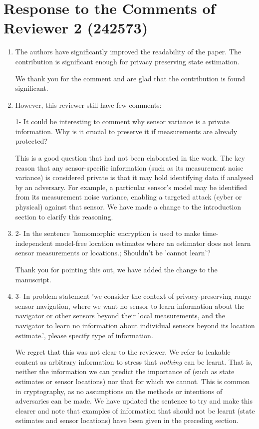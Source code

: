 \documentclass[a4paper]{scrartcl}
\newenvironment{rebuttal}{\begin{enumerate}[label={\color{grey}\thesection.\arabic{enumi}},leftmargin=0pt,ref=\thesection.\arabic{enumi}]}{\end{enumerate}}
\newcommand{\reviewtext}[1]{{\color{nblue} #1}}
\begin{document}
\section*{Response to the Comments of Reviewer 2 (242573)}
\def\thesection{R2}
\begin{rebuttal}
\item \reviewtext{The authors have significantly improved the readability of the paper. The contribution is significant enough for privacy preserving state estimation.}

We thank you for the comment and are glad that the contribution is found significant.

\item \reviewtext{However, this reviewer still have few comments:

1- It could be interesting to comment why sensor variance is a private information. Why is it crucial to preserve it if measurements are already protected?}

This is a good question that had not been elaborated in the work. The key reason that any sensor-specific information (such as its measurement noise variance) is considered private is that it may hold identifying data if analysed by an adversary. For example, a particular sensor's model may be identified from its measurement noise variance, enabling a targeted attack (cyber or physical) against that sensor. We have made a change to the introduction section to clarify this reasoning.

\item \reviewtext{2- In the sentence 'homomorphic encryption is used to make time-independent model-free location estimates where an estimator does not learn sensor measurements or locations.; Shouldn't be 'cannot learn'?}

Thank you for pointing this out, we have added the change to the manuscript.

\item \reviewtext{3- In problem statement 'we consider the context of privacy-preserving range sensor navigation, where we want no sensor to learn information about the navigator or other sensors beyond their local measurements, and the navigator to learn no information about individual sensors beyond its location estimate.', please specify type of information.}

We regret that this was not clear to the reviewer. We refer to leakable content as arbitrary information to stress that \textit{nothing} can be learnt. That is, neither the information we can predict the importance of (such as state estimates or sensor locations) nor that for which we cannot. This is common in cryptography, as no assumptions on the methods or intentions of adversaries can be made. We have updated the sentence to try and make this clearer and note that examples of information that should not be learnt (state estimates and sensor locations) have been given in the preceding section.


\end{rebuttal}
\end{document}
